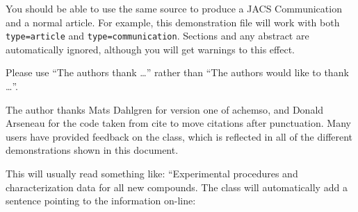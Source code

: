 \documentclass[journal=jacsat,manuscript=article]{achemso}
\begin{document}
You should be able to use the same source to produce a JACS
Communication and a normal article.  For example, this demonstration
file will work with both \texttt{type=article} and
\texttt{type=communication}. Sections and any abstract are
automatically ignored, although you will get warnings to this effect.

\begin{acknowledgement}

Please use ``The authors thank \ldots'' rather than ``The
authors would like to thank \ldots''.

The author thanks Mats Dahlgren for version one of \textsf{achemso},
and Donald Arseneau for the code taken from \textsf{cite} to move
citations after punctuation. Many users have provided feedback on the
class, which is reflected in all of the different demonstrations
shown in this document.

\end{acknowledgement}

\begin{suppinfo}

This will usually read something like: ``Experimental procedures and
characterization data for all new compounds. The class will
automatically add a sentence pointing to the information on-line:

\end{suppinfo}



\end{document}
